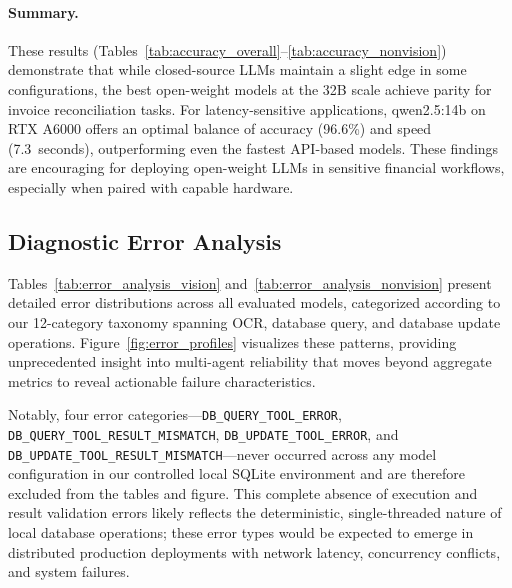 \documentclass[conference]{IEEEtran}
\begin{document}
\paragraph{Summary.}
These results (Tables~\ref{tab:accuracy_overall}--\ref{tab:accuracy_nonvision}) demonstrate that while closed-source LLMs maintain a slight edge in some configurations, the best open-weight models at the 32B scale achieve parity for invoice reconciliation tasks. For latency-sensitive applications, qwen2.5:14b on RTX A6000 offers an optimal balance of accuracy (96.6\%) and speed (7.3~seconds), outperforming even the fastest API-based models. These findings are encouraging for deploying open-weight LLMs in sensitive financial workflows, especially when paired with capable hardware.

\subsection{Diagnostic Error Analysis}
\label{sec:error_analysis}
Tables~\ref{tab:error_analysis_vision} and~\ref{tab:error_analysis_nonvision} present detailed error distributions across all evaluated models, categorized according to our 12-category taxonomy spanning OCR, database query, and database update operations. Figure~\ref{fig:error_profiles} visualizes these patterns, providing unprecedented insight into multi-agent reliability that moves beyond aggregate metrics to reveal actionable failure characteristics.

Notably, four error categories—\texttt{DB\_QUERY\_TOOL\_ERROR}, \\\texttt{DB\_QUERY\_TOOL\_RESULT\_MISMATCH}, \texttt{DB\_UPDATE\_TOOL\_ERROR}, and \texttt{DB\_UPDATE\_TOOL\_RESULT\_MISMATCH}—never occurred across any model configuration in our controlled local SQLite environment and are therefore excluded from the tables and figure. This complete absence of execution and result validation errors likely reflects the deterministic, single-threaded nature of local database operations; these error types would be expected to emerge in distributed production deployments with network latency, concurrency conflicts, and system failures.

\end{document}

